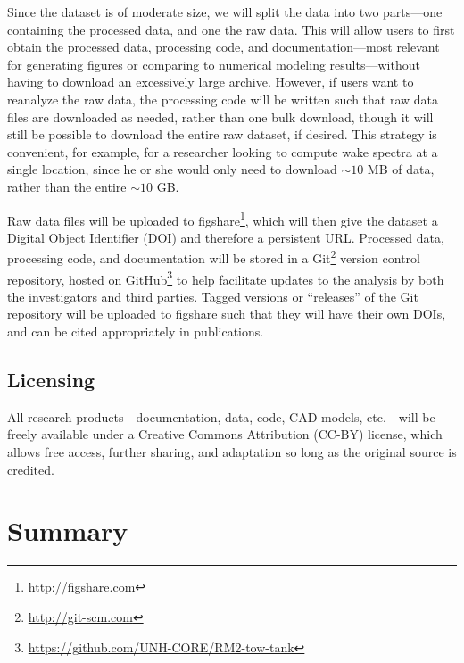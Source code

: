 \documentclass[12pt,letterpaper]{scrreprt}
\begin{document}
Since the dataset is of moderate size, we will split the data into two
parts---one containing the processed data, and one the raw data. This will allow
users to first obtain the processed data, processing code, and
documentation---most relevant for generating figures or comparing to numerical
modeling results---without having to download an excessively large archive.
However, if users want to reanalyze the raw data, the processing code will be
written such that raw data files are downloaded as needed, rather than one bulk
download, though it will still be possible to download the entire raw dataset,
if desired. This strategy is convenient, for example, for a researcher looking
to compute wake spectra at a single location, since he or she would only need to
download $\sim 10$ MB of data, rather than the entire $\sim 10$ GB.

Raw data files will be uploaded to figshare\footnote{\url{http://figshare.com}},
which will then give the dataset a Digital Object Identifier (DOI) and therefore
a persistent URL. Processed data, processing code, and documentation will be
stored in a Git\footnote{\url{http://git-scm.com}} version control repository,
hosted on GitHub\footnote{\url{https://github.com/UNH-CORE/RM2-tow-tank}} to
help facilitate updates to the analysis by both the investigators and third
parties. Tagged versions or ``releases'' of the Git repository will be uploaded
to figshare such that they will have their own DOIs, and can be cited
appropriately in publications.

\section{Licensing} 

All research products---documentation, data, code, CAD models, etc.---will be
freely available under a Creative Commons Attribution (CC-BY) license, which
allows free access, further sharing, and adaptation so long as the original
source is credited.


\chapter{Summary}
\end{document}
